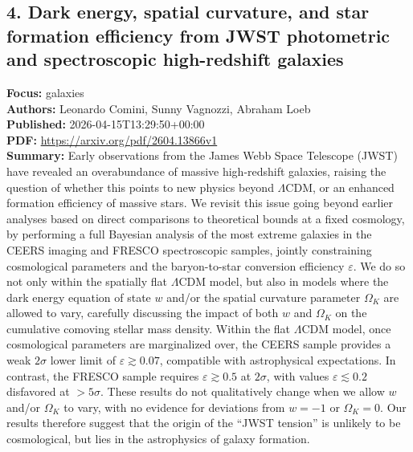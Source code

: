 \documentclass[11pt]{article}
\begin{document}
\subsection*{4. Dark energy, spatial curvature, and star formation efficiency from JWST photometric and spectroscopic high-redshift galaxies}
\textbf{Focus:} galaxies\\
\textbf{Authors:} Leonardo Comini, Sunny Vagnozzi, Abraham Loeb\\
\textbf{Published:} 2026-04-15T13:29:50+00:00\\
\textbf{PDF:} \href{https://arxiv.org/pdf/2604.13866v1}{https://arxiv.org/pdf/2604.13866v1}\\
\textbf{Summary:}
Early observations from the James Webb Space Telescope (JWST) have revealed an overabundance of massive high-redshift galaxies, raising the question of whether this points to new physics beyond $Λ$CDM, or an enhanced formation efficiency of massive stars. We revisit this issue going beyond earlier analyses based on direct comparisons to theoretical bounds at a fixed cosmology, by performing a full Bayesian analysis of the most extreme galaxies in the CEERS imaging and FRESCO spectroscopic samples, jointly constraining cosmological parameters and the baryon-to-star conversion efficiency $ε$. We do so not only within the spatially flat $Λ$CDM model, but also in models where the dark energy equation of state $w$ and/or the spatial curvature parameter $Ω_K$ are allowed to vary, carefully discussing the impact of both $w$ and $Ω_K$ on the cumulative comoving stellar mass density. Within the flat $Λ$CDM model, once cosmological parameters are marginalized over, the CEERS sample provides a weak $2\sigma $ lower limit of $ε\gtrsim 0.07$, compatible with astrophysical expectations. In contrast, the FRESCO sample requires $ε\gtrsim 0.5$ at $2\sigma $, with values $ε\lesssim 0.2$ disfavored at $>5\sigma $. These results do not qualitatively change when we allow $w$ and/or $Ω_K$ to vary, with no evidence for deviations from $w=-1$ or $Ω_K=0$. Our results therefore suggest that the origin of the ``JWST tension'' is unlikely to be cosmological, but lies in the astrophysics of galaxy formation.
\newpage
\end{document}
